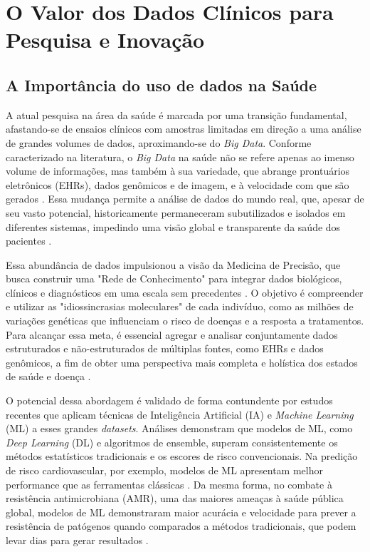 \section{O Valor dos Dados Clínicos para Pesquisa e Inovação}
\label{sec:fund-valor-dados}

\subsection{A Importância do uso de dados na Saúde}
\label{subsec:fund-importancia-dados}
A atual pesquisa na área da saúde é marcada por uma transição fundamental, afastando-se de ensaios clínicos com amostras limitadas em direção a uma análise de grandes volumes de dados, aproximando-se do \textit{Big Data}. Conforme caracterizado na literatura, o \textit{Big Data} na saúde não se refere apenas ao imenso volume de informações, mas também à sua variedade, que abrange prontuários eletrônicos (EHRs), dados genômicos e de imagem, e à velocidade com que são gerados \cite{Belle2015}. Essa mudança permite a análise de dados do mundo real, que, apesar de seu vasto potencial, historicamente permaneceram subutilizados e isolados em diferentes sistemas, impedindo uma visão global e transparente da saúde dos pacientes \cite{Belle2015}.

Essa abundância de dados impulsionou a visão da Medicina de Precisão, que busca construir uma "Rede de Conhecimento" para integrar dados biológicos, clínicos e diagnósticos em uma escala sem precedentes \cite{NationalResearchCouncil2011}. O objetivo é compreender e utilizar as "idiossincrasias moleculares" de cada indivíduo, como as milhões de variações genéticas que influenciam o risco de doenças e a resposta a tratamentos. Para alcançar essa meta, é essencial agregar e analisar conjuntamente dados estruturados e não-estruturados de múltiplas fontes, como EHRs e dados genômicos, a fim de obter uma perspectiva mais completa e holística dos estados de saúde e doença \cite{Belle2015, NationalResearchCouncil2011}.

O potencial dessa abordagem é validado de forma contundente por estudos recentes que aplicam técnicas de Inteligência Artificial (IA) e \textit{Machine Learning} (ML) a esses grandes \textit{datasets}. Análises demonstram que modelos de ML, como \textit{Deep Learning} (DL) e algoritmos de ensemble, superam consistentemente os métodos estatísticos tradicionais e os escores de risco convencionais. Na predição de risco cardiovascular, por exemplo, modelos de ML apresentam melhor performance que as ferramentas clássicas \cite{Liu2025}. Da mesma forma, no combate à resistência antimicrobiana (AMR), uma das maiores ameaças à saúde pública global, modelos de ML demonstraram maior acurácia e velocidade para prever a resistência de patógenos quando comparados a métodos tradicionais, que podem levar dias para gerar resultados \cite{Pennisi2025}.

